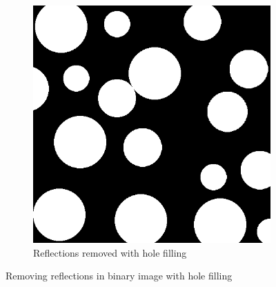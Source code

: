\documentclass[]{article}
\begin{document}
\begin{figure}[H]
\begin{subfigure}{0.5\textwidth}
        \includegraphics[width=\textwidth]{img/balls-with-reflections-filled}
        \caption{Reflections removed with hole filling}
        \label{fig:balls_after}
    \end{subfigure}%
    \caption{Removing reflections in binary image with hole filling}
    \label{fig:balls}
\end{figure}
\end{document}
